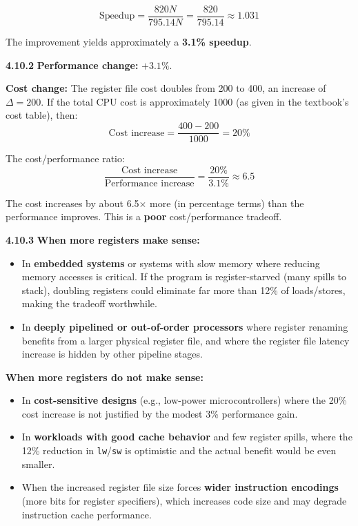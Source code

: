 \[
  \text{Speedup} = \frac{820N}{795.14N}
  = \frac{820}{795.14} \approx \boxed{1.031}
\]

The improvement yields approximately a \textbf{3.1\% speedup}.

\medskip\noindent\textbf{4.10.2}
\textbf{Performance change:} $+3.1\%$.

\textbf{Cost change:} The register file cost doubles from 200 to 400,
an increase of $\Delta = 200$.  If the total CPU cost is approximately
1000 (as given in the textbook's cost table), then:
\[
  \text{Cost increase} = \frac{400 - 200}{1000} = 20\%
\]

The cost/performance ratio:
\[
  \frac{\text{Cost increase}}{\text{Performance increase}}
  = \frac{20\%}{3.1\%} \approx 6.5
\]

The cost increases by about 6.5$\times$ more (in percentage terms) than the
performance improves.  This is a \textbf{poor} cost/performance tradeoff.

\medskip\noindent\textbf{4.10.3}
\textbf{When more registers make sense:}
\begin{itemize}
  \item In \textbf{embedded systems} or systems with slow memory where
        reducing memory accesses is critical.  If the program is
        register-starved (many spills to stack), doubling registers could
        eliminate far more than 12\% of loads/stores, making the tradeoff
        worthwhile.
  \item In \textbf{deeply pipelined or out-of-order processors} where
        register renaming benefits from a larger physical register file,
        and where the register file latency increase is hidden by other
        pipeline stages.
\end{itemize}

\textbf{When more registers do not make sense:}
\begin{itemize}
  \item In \textbf{cost-sensitive designs} (e.g., low-power
        microcontrollers) where the 20\% cost increase is not justified by
        the modest 3\% performance gain.
  \item In \textbf{workloads with good cache behavior} and few register
        spills, where the 12\% reduction in \texttt{lw}/\texttt{sw} is
        optimistic and the actual benefit would be even smaller.
  \item When the increased register file size forces \textbf{wider
        instruction encodings} (more bits for register specifiers), which
        increases code size and may degrade instruction cache performance.
\end{itemize}
